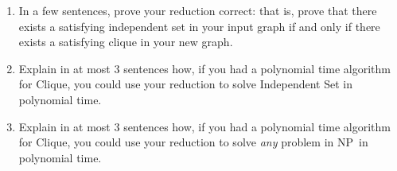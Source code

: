 \documentclass[12 pt, letterpaper]{hmcpset}
\newcommand{\NP}{\textsf{NP}}
\begin{document}
\begin{problem}
\begin{enumerate}
    \item In a few sentences, prove your reduction correct: that is, prove that there exists a satisfying independent set in your input graph if and only if there exists a satisfying clique in your new graph.

    \item Explain in at most 3 sentences how, if you had a polynomial time algorithm for {\sc Clique}, you could use your reduction to solve {\sc Independent Set} in polynomial time.

    \item Explain in at most 3 sentences how, if you had a polynomial time algorithm for {\sc Clique}, you could use your reduction to solve \emph{any} problem in \NP~in polynomial time.
\end{enumerate}
\end{problem}
\end{document}
